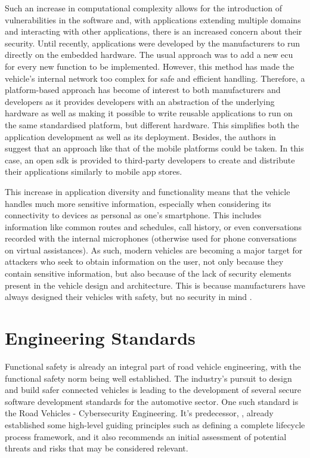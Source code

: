 Such an increase in computational complexity allows for the introduction of vulnerabilities in the software and, with applications extending multiple domains and interacting with other applications, there is an increased concern about their security. Until recently, applications were developed by the manufacturers to run directly on the embedded hardware. The usual approach was to add a new \gls{ecu} for every new function to be implemented. However, this method has made the vehicle’s internal network too complex for safe and efficient handling. Therefore, a platform-based approach has become of interest to both manufacturers and developers as it provides developers with an abstraction of the underlying hardware as well as making it possible to write reusable applications to run on the same standardised platform, but different hardware. This simplifies both the application development as well as its deployment. Besides, the authors in \cite{Holle} suggest that an approach like that of the mobile platforms could be taken. In this case, an open \gls{sdk} is provided to third-party developers to create and distribute their applications similarly to mobile app stores.\par

This increase in application diversity and functionality means that the vehicle handles much more sensitive information, especially when considering its connectivity to devices as personal as one’s smartphone. This includes information like common routes and schedules, call history, or even conversations recorded with the internal microphones (otherwise used for phone conversations on virtual assistances). As such, modern vehicles are becoming a major target for attackers who seek to obtain information on the user, not only because they contain sensitive information, but also because of the lack of security elements present in the vehicle design and architecture. This is because manufacturers have always designed their vehicles with safety, but no security in mind \citep{Siegel2018}.

\section{Engineering Standards}

Functional safety is already an integral part of road vehicle engineering, with the functional safety norm \cite{ISO26262} being well established. The industry's pursuit to design and build safer connected vehicles is leading to the development of several secure software development standards for the automotive sector. One such standard is the \cite{ISO21434} Road Vehicles - Cybersecurity Engineering. It's predecessor, \cite{SAEJ3061}, already established some high-level guiding principles such as defining a complete lifecycle process framework, and it also recommends an initial assessment of potential threats and risks that may be considered relevant.\par

